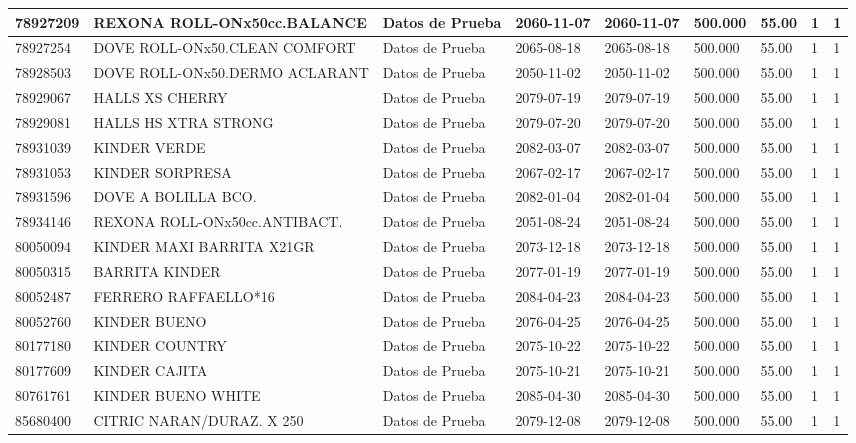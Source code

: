 \documentclass[a4paper,12pt]{article}
\begin{document}
\begin{landscape}
\begin{longtable}{|p{4cm}|p{2.5cm}|p{2.5cm}|p{1.8cm}|p{1.8cm}|p{1cm}|p{1cm}|p{3cm}|p{3cm}||}
78927209 & REXONA ROLL-ONx50cc.BALANCE & Datos de Prueba & 2060-11-07 & 2060-11-07 & 500.000 & 55.00 & 1 & 1 \\ \hline 
78927254 & DOVE ROLL-ONx50.CLEAN COMFORT & Datos de Prueba & 2065-08-18 & 2065-08-18 & 500.000 & 55.00 & 1 & 1 \\ \hline 
78928503 & DOVE ROLL-ONx50.DERMO ACLARANT & Datos de Prueba & 2050-11-02 & 2050-11-02 & 500.000 & 55.00 & 1 & 1 \\ \hline 
78929067 & HALLS XS CHERRY & Datos de Prueba & 2079-07-19 & 2079-07-19 & 500.000 & 55.00 & 1 & 1 \\ \hline 
78929081 & HALLS HS XTRA STRONG & Datos de Prueba & 2079-07-20 & 2079-07-20 & 500.000 & 55.00 & 1 & 1 \\ \hline 
78931039 & KINDER VERDE & Datos de Prueba & 2082-03-07 & 2082-03-07 & 500.000 & 55.00 & 1 & 1 \\ \hline 
78931053 & KINDER SORPRESA & Datos de Prueba & 2067-02-17 & 2067-02-17 & 500.000 & 55.00 & 1 & 1 \\ \hline 
78931596 & DOVE A BOLILLA BCO. & Datos de Prueba & 2082-01-04 & 2082-01-04 & 500.000 & 55.00 & 1 & 1 \\ \hline 
78934146 & REXONA ROLL-ONx50cc.ANTIBACT. & Datos de Prueba & 2051-08-24 & 2051-08-24 & 500.000 & 55.00 & 1 & 1 \\ \hline 
80050094 & KINDER MAXI BARRITA X21GR & Datos de Prueba & 2073-12-18 & 2073-12-18 & 500.000 & 55.00 & 1 & 1 \\ \hline 
80050315 & BARRITA KINDER & Datos de Prueba & 2077-01-19 & 2077-01-19 & 500.000 & 55.00 & 1 & 1 \\ \hline 
80052487 & FERRERO RAFFAELLO*16 & Datos de Prueba & 2084-04-23 & 2084-04-23 & 500.000 & 55.00 & 1 & 1 \\ \hline 
80052760 & KINDER BUENO & Datos de Prueba & 2076-04-25 & 2076-04-25 & 500.000 & 55.00 & 1 & 1 \\ \hline 
80177180 & KINDER COUNTRY & Datos de Prueba & 2075-10-22 & 2075-10-22 & 500.000 & 55.00 & 1 & 1 \\ \hline 
80177609 & KINDER CAJITA & Datos de Prueba & 2075-10-21 & 2075-10-21 & 500.000 & 55.00 & 1 & 1 \\ \hline 
80761761 & KINDER  BUENO   WHITE & Datos de Prueba & 2085-04-30 & 2085-04-30 & 500.000 & 55.00 & 1 & 1 \\ \hline 
85680400 & CITRIC NARAN/DURAZ. X 250 & Datos de Prueba & 2079-12-08 & 2079-12-08 & 500.000 & 55.00 & 1 & 1 \\ \hline 

\end{longtable}
\end{landscape}
\end{document}
